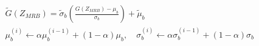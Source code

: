 ﻿\documentclass{article}
\begin{document}
\begin{preview}
\(\displaystyle
\begin{gathered}
  \widetilde{G}(Z_{MRB})
  = \widetilde{\sigma}_b
  \left(\frac{G(Z_{MRB})-\mu_b}{\sigma_b}\right)
  +\widetilde{\mu}_b \\
  \mu_b^{(i)}
  \leftarrow \alpha\mu_b^{(i-1)}+(1-\alpha)\mu_b, \quad
  \sigma_b^{(i)}
  \leftarrow \alpha\sigma_b^{(i-1)}+(1-\alpha)\sigma_b 
\end{gathered}
\)
\end{preview}
\end{document}
